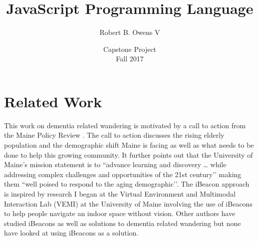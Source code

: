 \documentclass[11pt]{article}
\title{JavaScript Programming Language}
\author{Robert B. Owens V}
\date{\small Capstone Project\\[.5em]
\small Fall 2017}
\begin{document}
\maketitle

\section{Related Work}
	This work on dementia related wandering is motivated by a call to action from the Maine Policy Review \cite{MPR}. The call to action discusses the rising elderly population and the demographic shift Maine is facing as well as what needs to be done to help this growing community. It further points out that the University of Maine’s mission statement is to ``advance learning and discovery … while addressing complex challenges and opportunities of the 21st century’’ making them ``well poised to respond to the aging demographic’’\cite{MPR}. The iBeacon approach is inspired by research I began at the Virtual Environment and Multimodal Interaction Lab (VEMI) at the University of Maine involving the use of iBeacons to help people navigate an indoor space without vision. Other authors have studied iBeacons \cite{chawathe,ng,schmalenstroeer} as well as solutions to dementia related wandering \cite{bail,robinson,sposaro} but none have looked at using iBeacons as a solution. 

 


\printbibliography
\end{document}
